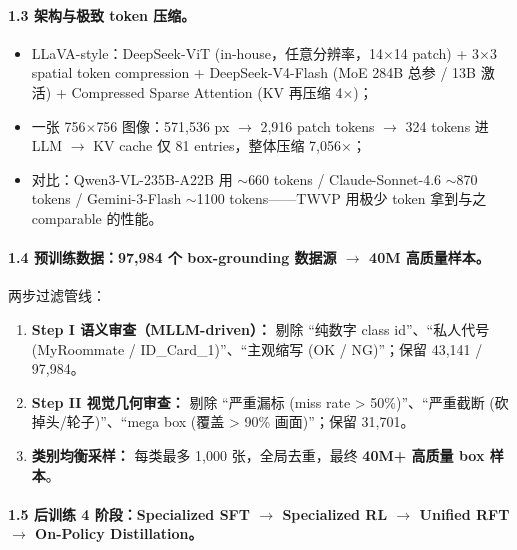 \paragraph{1.3 架构与极致 token 压缩。}

\begin{itemize}[leftmargin=1.5em]
  \item LLaVA-style：DeepSeek-ViT (in-house，任意分辨率，14$\times$14 patch) + 3$\times$3 spatial token compression + DeepSeek-V4-Flash (MoE 284B 总参 / 13B 激活) + Compressed Sparse Attention (KV 再压缩 4$\times$)；
  \item 一张 756$\times$756 图像：571,536 px $\to$ 2,916 patch tokens $\to$ 324 tokens 进 LLM $\to$ KV cache 仅 81 entries，整体压缩 7,056$\times$；
  \item 对比：Qwen3-VL-235B-A22B 用 $\sim$660 tokens / Claude-Sonnet-4.6 $\sim$870 tokens / Gemini-3-Flash $\sim$1100 tokens——TWVP 用极少 token 拿到与之 comparable 的性能。
\end{itemize}

\paragraph{1.4 预训练数据：97,984 个 box-grounding 数据源 $\to$ 40M 高质量样本。}

两步过滤管线：
\begin{enumerate}[leftmargin=1.5em]
  \item \textbf{Step I 语义审查（MLLM-driven）：} 剔除 ``纯数字 class id''、``私人代号 (MyRoommate / ID\_Card\_1)''、``主观缩写 (OK / NG)''；保留 43,141 / 97,984。
  \item \textbf{Step II 视觉几何审查：} 剔除 ``严重漏标 (miss rate > 50\%)''、``严重截断 (砍掉头/轮子)''、``mega box (覆盖 > 90\% 画面)''；保留 31,701。
  \item \textbf{类别均衡采样：} 每类最多 1,000 张，全局去重，最终 \textbf{40M+ 高质量 box 样本}。
\end{enumerate}

\paragraph{1.5 后训练 4 阶段：Specialized SFT $\to$ Specialized RL $\to$ Unified RFT $\to$ On-Policy Distillation。}

